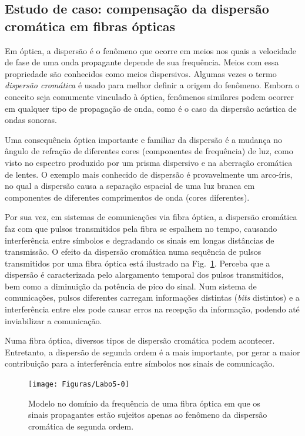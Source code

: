 \documentclass[12pt,addpoints]{exam}
\begin{document}
\subsection{Estudo de caso: compensação da dispersão cromática em fibras ópticas}
Em óptica, a dispersão é o fenômeno que ocorre em meios nos quais a velocidade de fase de uma onda propagante depende de sua frequência. Meios com essa propriedade são conhecidos como meios dispersivos. Algumas vezes o termo \textit{dispersão cromática} é usado para melhor definir a origem do fenômeno. Embora o conceito seja comumente vinculado à óptica, fenômenos similares podem ocorrer em qualquer tipo de propagação de onda, como é o caso da dispersão acústica de ondas sonoras.
 
Uma consequência óptica importante e familiar da dispersão é a mudança no ângulo de refração de diferentes cores (componentes de frequência) de luz, como visto no espectro produzido por um prisma dispersivo e na aberração cromática de lentes. O exemplo mais conhecido de dispersão é provavelmente um arco-íris, no qual a dispersão causa a separação espacial de uma luz branca em componentes de diferentes comprimentos de onda (cores diferentes). 

Por sua vez, em sistemas de comunicações via fibra óptica, a dispersão cromática faz com que pulsos transmitidos pela fibra se espalhem no tempo, causando interferência entre símbolos e degradando os sinais em longas distâncias de transmissão. O efeito da dispersão cromática numa sequência de pulsos transmitidos por uma fibra óptica está ilustrado na Fig.~\ref{fig:GRC_5-0}. Perceba que a dispersão é caracterizada pelo alargamento temporal dos pulsos transmitidos, bem como a diminuição da potência de pico do sinal. Num sistema de comunicações, pulsos diferentes carregam informações  distintas (\textit{bits} distintos) e a interferência entre eles pode causar erros na recepção da informação, podendo até inviabilizar a comunicação.

Numa fibra óptica, diversos tipos de dispersão cromática podem acontecer. Entretanto, a dispersão de segunda ordem é a mais importante, por gerar a maior contribuição para a interferência entre símbolos nos sinais de comunicação. 

\begin{figure}[h]
        \centering
        \texttt{[image: Figuras/Labo5-0]}
        \caption{Modelo no domínio da frequência de uma fibra óptica em que os sinais propagantes estão sujeitos apenas ao fenômeno da dispersão cromática de segunda ordem.}
        \label{fig:GRC_5-0}
\end{figure}
\end{document}
